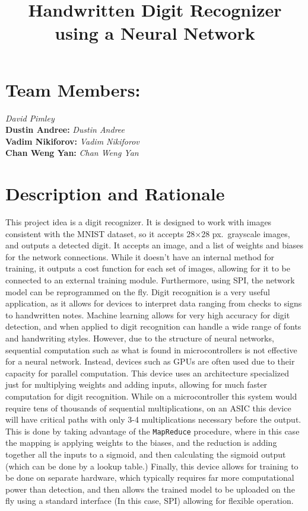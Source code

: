 \documentclass[12pt]{article}
\title{\vspace{-50pt}\textbf{\fontsize{14pt}{14pt}\selectfont Handwritten Digit Recognizer using a Neural Network}\vspace{-50pt}}
\author{}
\date{}
\begin{document}
\maketitle
\section*{Team Members:}
{\fontsize{14pt}{14pt}\selectfont{\bf David Pimley:} \emph{David Pimley}\\[10pt]
{\bf Dustin Andree:} \emph{Dustin Andree}\\[10pt]
{\bf Vadim Nikiforov:} \emph{Vadim Nikiforov}\\[10pt]
{\bf Chan Weng Yan:} \emph{Chan Weng Yan}}
\section{Description and Rationale}
This project idea is a digit recognizer. It is designed to work with images consistent with the MNIST dataset, so it accepts 28$\times$28 px.~grayscale images, and outputs a detected digit. It accepts an image, and a list of weights and biases for the network connections. While it doesn't have an internal method for training, it outputs a cost function for each set of images, allowing for it to be connected to an external training module. Furthermore, using SPI, the network model can be reprogrammed on the fly. Digit recognition is a very useful application, as it allows for devices to interpret data ranging from checks to signs to handwritten notes. Machine learning allows for very high accuracy for digit detection, and when applied to digit recognition can handle a wide range of fonts and handwriting styles. However, due to the structure of neural networks, sequential computation such as what is found in microcontrollers is not effective for a neural network. Instead, devices such as GPUs are often used due to their capacity for parallel computation. This device uses an architecture specialized just for multiplying weights and adding inputs, allowing for much faster computation for digit recognition. While on a microcontroller this system would require tens of thousands of sequential multiplications, on an ASIC this device will have critical paths with only 3-4 multiplications necessary before the output. This is done by taking advantage of the \texttt{MapReduce} procedure, where in this case the mapping is applying weights to the biases, and the reduction is adding together all the inputs to a sigmoid, and then calculating the sigmoid output (which can be done by a lookup table.) Finally, this device allows for training to be done on separate hardware, which typically requires far more computational power than detection, and then allows the trained model to be uploaded on the fly using a standard interface (In this case, SPI) allowing for flexible operation.
\newpage
\end{document}
